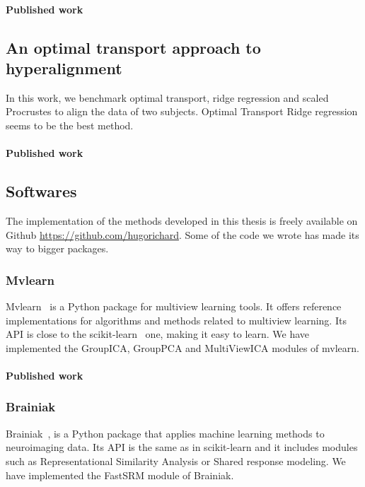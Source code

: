 \documentclass[ twoside,openright,titlepage,numbers=noenddot,%
                headinclude,footinclude,cleardoublepage=empty,abstract=on,
                BCOR=5mm,paper=a4,fontsize=11pt, 
                ]{scrreprt}
\begin{document}
  
\paragraph{Published work}

\subsection{An optimal transport approach to hyperalignment}
In this work, we benchmark optimal transport, ridge regression and scaled
Procrustes to align the data of two
subjects. Optimal Transport Ridge regression seems to be the best method.

\paragraph{Published work}


\subsection{Softwares}
The implementation of the methods developed in this thesis is freely available on Github \url{https://github.com/hugorichard}. Some of the code we wrote has made its way to bigger packages. 

\subsubsection{Mvlearn}
Mvlearn~\cite{perry2020mvlearn} is a Python package for multiview learning tools. It offers reference
implementations for algorithms and methods related to multiview learning.
Its API is close to the scikit-learn~\cite{abraham2014machine} one, making it
easy to learn.
We have implemented the GroupICA, GroupPCA and MultiViewICA modules of mvlearn.

\paragraph{Published work}



\subsubsection{Brainiak}
Brainiak~\cite{kumar2020brainiak}, is a Python package that applies machine
learning methods to neuroimaging data. Its API is the same as in scikit-learn
and it includes modules such as Representational Similarity Analysis or Shared
response modeling.
We have implemented the FastSRM module of Brainiak.
\end{document}
